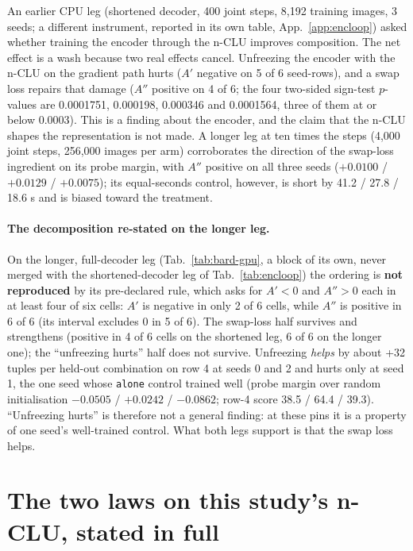 \documentclass{article} %
\begin{document}
An earlier CPU leg (shortened decoder, 400 joint steps, 8,192 training images, 3 seeds; a
different instrument, reported in its own table, App.~\ref{app:encloop}) asked whether
training the encoder through the n-CLU improves composition. The net effect is a wash because two
real effects cancel. Unfreezing the encoder with the n-CLU on the gradient path hurts ($A'$
negative on 5 of 6 seed-rows), and a swap loss repairs that damage ($A''$ positive on 4 of 6;
the four two-sided sign-test $p$-values are 0.0001751, 0.000198, 0.000346 and 0.0001564, three
of them at or below 0.0003). This is a finding about the encoder, and the claim
that the n-CLU shapes the representation is not made. %
A longer leg at ten times the steps (4,000 joint steps, 256,000 images per arm) corroborates
the direction of the swap-loss ingredient on its probe margin, with $A''$ positive on all three
seeds ($+0.0100$ / $+0.0129$ / $+0.0075$); its equal-seconds control, however, is short by 41.2 /
27.8 / 18.6 s and is biased toward the treatment. %
\paragraph{The decomposition re-stated on the longer leg.} On the
longer, full-decoder leg (Tab.~\ref{tab:bard-gpu}, a block of its own, never merged with the
shortened-decoder leg of Tab.~\ref{tab:encloop}) the ordering is \textbf{not reproduced} by its
pre-declared rule, which asks for $A'<0$ and $A''>0$ each in at least four of six cells: $A'$ is
negative in only 2 of 6 cells, while $A''$ is positive in 6 of 6 (its interval excludes 0 in 5 of %
6). The swap-loss half survives and strengthens (positive in 4 of 6 cells on the shortened leg, 6 %
of 6 on the longer one); the ``unfreezing hurts'' half does not survive. Unfreezing \emph{helps} by
about +32 tuples per held-out combination on row 4 at seeds 0 and 2 and hurts only at seed 1, the one seed whose %
\texttt{alone} control trained well (probe margin over random initialisation $-0.0505$ / %
$+0.0242$ / $-0.0862$; row-4 score 38.5 / 64.4 / 39.3). ``Unfreezing hurts'' is therefore not a %
general finding: at these pins it is a property of one seed's well-trained control. What both legs
support is that the swap loss helps.

\section{The two laws on this study's n-CLU, stated in full}
\label{app:laws}
\end{document}
